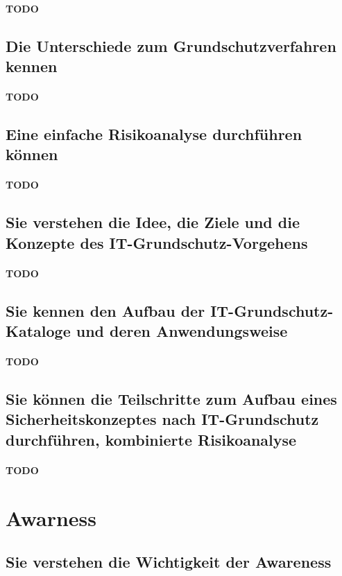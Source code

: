 \documentclass[10pt,a4paper]{article}
\begin{document}
\paragraph*{TODO}
\subsection*{Die Unterschiede zum Grundschutzverfahren kennen}
\paragraph*{TODO}
\subsection*{Eine einfache Risikoanalyse durchführen können}
\paragraph*{TODO}
\subsection*{Sie verstehen die Idee, die Ziele und die Konzepte des IT-Grundschutz-Vorgehens}
\paragraph*{TODO}
\subsection*{Sie kennen den Aufbau der IT-Grundschutz-Kataloge und deren Anwendungsweise}
\paragraph*{TODO}
\subsection*{Sie können die Teilschritte zum Aufbau eines Sicherheitskonzeptes nach IT-Grundschutz durchführen, kombinierte Risikoanalyse}
\paragraph*{TODO}


\section{Awarness}
\subsection*{Sie verstehen die Wichtigkeit der \flqq Awareness \frqq}
\end{document}
